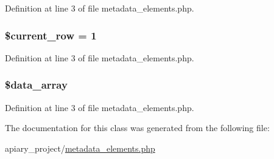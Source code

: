 Definition at line 3 of file metadata\_\-elements.php.

\hypertarget{classmetadata__elements_a2ec3a266ee95cda75cdbb71bc9ee1b53}{
\subsubsection[{\$current\_\-row}]{\setlength{\rightskip}{0pt plus 5cm}\$current\_\-row = 1}}
\label{classmetadata__elements_a2ec3a266ee95cda75cdbb71bc9ee1b53}


Definition at line 3 of file metadata\_\-elements.php.

\hypertarget{classmetadata__elements_a1a4843ada02b238f638d513eda265207}{
\subsubsection[{\$data\_\-array}]{\setlength{\rightskip}{0pt plus 5cm}\$data\_\-array}}
\label{classmetadata__elements_a1a4843ada02b238f638d513eda265207}


Definition at line 3 of file metadata\_\-elements.php.



The documentation for this class was generated from the following file:\begin{DoxyCompactItemize}
\item 
apiary_project/\hyperlink{metadata__elements_8php}{metadata\_\-elements.php}\end{DoxyCompactItemize}
